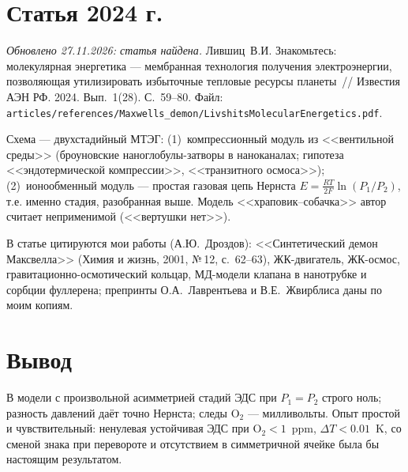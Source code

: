 \documentclass[11pt,a4paper]{article}
\begin{document}
\section{Статья 2024 г.}
\emph{Обновлено 27.11.2026: статья найдена.}
Лившиц~В.И. Знакомьтесь: молекулярная энергетика --- мембранная технология получения электроэнергии,
позволяющая утилизировать избыточные тепловые ресурсы планеты~// Известия АЭН РФ. 2024. Вып.~1(28).
С.~59--80. Файл: \texttt{articles/references/Maxwells\_demon/LivshitsMolecularEnergetics.pdf}.

Схема --- двухстадийный МТЭГ: (1)~компрессионный модуль из <<вентильной среды>> (броуновские
наноглобулы-затворы в наноканалах; гипотеза <<эндотермической компрессии>>, <<транзитного осмоса>>);
(2)~ионообменный модуль --- простая газовая цепь Нернста $E=\frac{RT}{2F}\ln(P_1/P_2)$, т.е. именно
стадия, разобранная выше. Модель <<храповик--собачка>> автор считает неприменимой (<<вертушки нет>>).

В статье цитируются мои работы (А.Ю.~Дроздов): <<Синтетический демон Максвелла>> (Химия и жизнь, 2001,
№\,12, с.~62--63), ЖК-двигатель, ЖК-осмос, гравитационно-осмотический кольцар, МД-модели клапана
в нанотрубке и сорбции фуллерена; препринты О.А.~Лаврентьева и В.Е.~Жвирблиса даны по моим копиям.


\section{Вывод}
В модели с произвольной асимметрией стадий ЭДС при $P_1=P_2$ строго ноль; разность давлений даёт точно
Нернста; следы O$_2$ --- милливольты. Опыт простой и чувствительный: ненулевая устойчивая ЭДС при
O$_2<1$~ppm, $\Delta T<0.01$~K, со сменой знака при перевороте и отсутствием в симметричной ячейке была бы
настоящим результатом.
\end{document}

